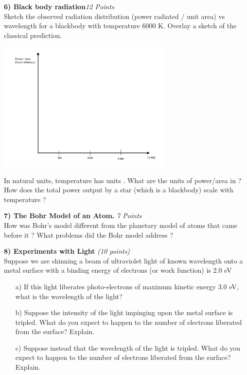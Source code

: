 {\clearpage


\textbf{6) Black body radiation}\hfill \textit{12 Points}\\
Sketch the observed radiation distribution (power radiated / unit area) vs wavelength for a blackbody with temperature 6000 K.
Overlay a sketch of the classical prediction.

\begin{center}
\includegraphics[width=0.65\textwidth]{./Axes.pdf}
\end{center}

In natural units, temperature has units \GeV.  What are the units of power/area in \GeV ? How does the total power output by a star (which is a blackbody) scale with temperature ?

\vspace{1.25in}

\begin{minipage}{\textwidth}
\textbf{7) The Bohr Model of an Atom. }\hfill \textit{7 Points}\\
How was Bohr's model different from the planetary model of atoms that came before it ?
What problems did the Bohr model address ?
\end{minipage}

\vspace{3.25in}


\clearpage

\textbf{8) Experiments with Light }\hfill \textit{(10 points)}\\

Suppose we are shinning a beam of ultraviolet light of known wavelength onto a metal surface with a binding energy of electrons (or work function) is 2.0 eV

\begin{itemize}
\item[a)] If this light liberates photo-electrons of maximum kinetic energy 3.0 eV, what is the wavelength of the light?
\vfill
\item[b)] Suppose the intensity of the light impinging upon the metal surface is tripled. What do you expect to happen to the number of electrons liberated from the surface? Explain.
\vfill
\item[c)] Suppose instead that the wavelength of the light is tripled. What do you expect to happen to the number of electrons liberated from the surface? Explain.
\vfill
\end{itemize}

}
